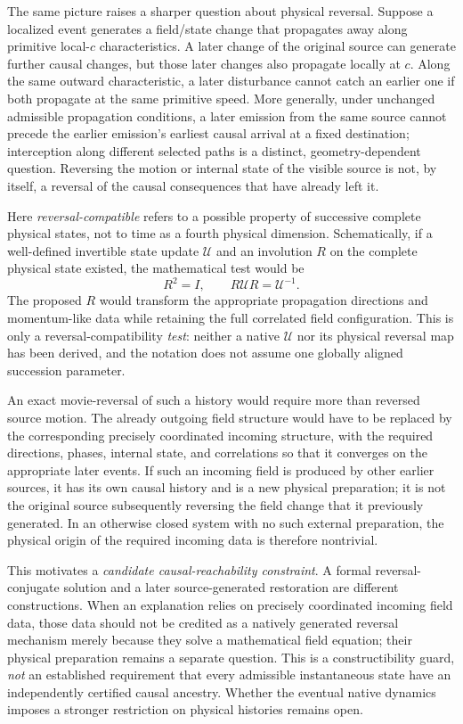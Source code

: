 \documentclass[11pt]{article}
\theoremstyle{definition}
\begin{document}
The same picture raises a sharper question about physical reversal.  Suppose a localized
event generates a field/state change that propagates away along primitive local-$c$
characteristics.  A later change of the original source can generate further causal
changes, but those later changes also propagate locally at $c$.  Along the same
outward characteristic, a later disturbance cannot catch an earlier one if
both propagate at the same primitive speed.  More generally, under unchanged
admissible propagation conditions, a later emission from the same source cannot
precede the earlier emission's earliest causal arrival at a fixed destination;
interception along different selected paths is a distinct, geometry-dependent
question.  Reversing the motion or internal state of the visible source is not,
by itself, a reversal of the causal consequences that have already left it.

Here \emph{reversal-compatible} refers to a possible property of successive complete
physical states, not to time as a fourth physical dimension.  Schematically, if a
well-defined invertible state update $\mathcal U$ and an involution $R$ on the
complete physical state existed, the mathematical test would be
\begin{equation}
R^2=I,\qquad R\mathcal U R=\mathcal U^{-1}.
\end{equation}
The proposed $R$ would transform the appropriate propagation directions and
momentum-like data while retaining the full correlated field configuration.
This is only a reversal-compatibility \emph{test}: neither a native $\mathcal U$
nor its physical reversal map has been derived, and the notation does not
assume one globally aligned succession parameter.

An exact movie-reversal of such a history would require more than reversed source motion.
The already outgoing field structure would have to be replaced by the corresponding
precisely coordinated incoming structure, with the required directions, phases, internal
state, and correlations so that it converges on the appropriate later events.  If such an
incoming field is produced by other earlier sources, it has its own causal history and is
a new physical preparation; it is not the original source subsequently reversing the
field change that it previously generated.  In an otherwise closed system with no such
external preparation, the physical origin of the required incoming data is therefore
nontrivial.

This motivates a \emph{candidate causal-reachability constraint}.  A formal
reversal-conjugate solution and a later source-generated restoration are different
constructions.  When an explanation relies on precisely coordinated incoming field data,
those data should not be credited as a natively generated reversal mechanism merely
because they solve a mathematical field equation; their physical preparation remains a
separate question.  This is a constructibility guard, \emph{not} an established
requirement that every admissible instantaneous state have an independently certified
causal ancestry.  Whether the eventual native dynamics imposes a stronger restriction
on physical histories remains open.
\end{document}
